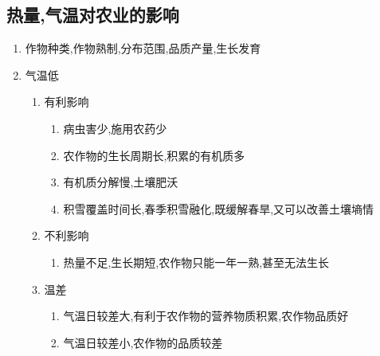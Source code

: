 \documentclass[a4paper]{article}
\begin{document}
    \subsection{热量,气温对农业的影响}
    \begin{enumerate}
        \item 作物种类,作物熟制,分布范围,品质产量,生长发育
        \item 气温低 %
        \begin{enumerate}
            \item 有利影响
            \begin{enumerate}
                \item 病虫害少,施用农药少 %
                \item 农作物的生长周期长,积累的有机质多
                \item 有机质分解慢,土壤肥沃
                \item 积雪覆盖时间长,春季积雪融化,既缓解春旱,又可以改善土壤墒情
            \end{enumerate}
            \item 不利影响
            \begin{enumerate}
                \item 热量不足,生长期短,农作物只能一年一熟,甚至无法生长
            \end{enumerate}
            \item 温差
            \begin{enumerate}
                \item 气温日较差大,有利于农作物的营养物质积累,农作物品质好
                \item 气温日较差小,农作物的品质较差
            \end{enumerate}
        \end{enumerate}
    \end{enumerate}
\end{document}
